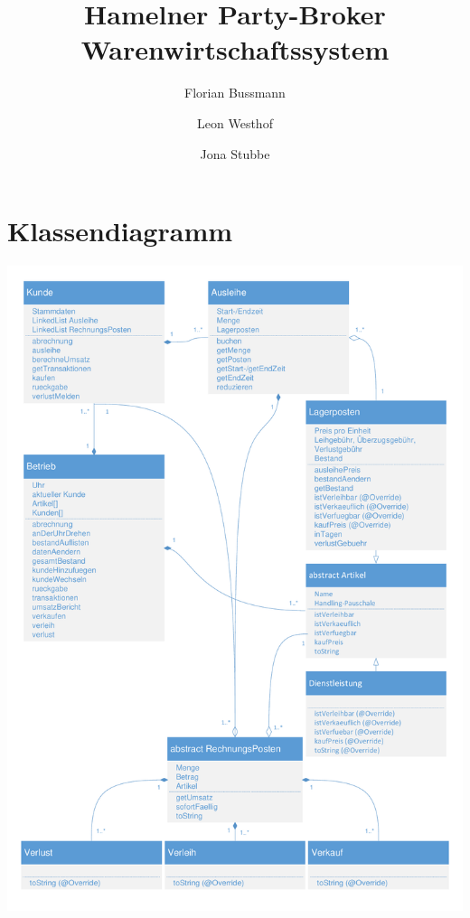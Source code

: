 \documentclass[a4paper,12pt,titlepage]{article}
\title{Hamelner Party-Broker Warenwirtschaftssystem}
\author{Florian Bussmann \and Leon Westhof \and Jona Stubbe}
\begin{document}
\maketitle
\tableofcontents
\part{Klassendiagramm}
\includegraphics[width=\textwidth]{Klassendiagramm.pdf}
\newpage
\end{document}
